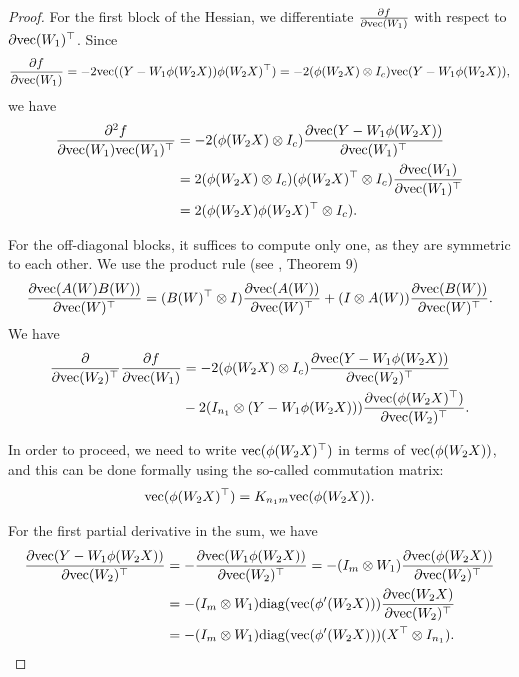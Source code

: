 \documentclass[a4paper,11pt]{article}
\newcommand{\1}{\mathbbm{1}}
\theoremstyle{plain}
\begin{document}
\begin{proof}
For the first block of the Hessian, we differentiate $\frac{\partial f}{\partial \textnormal{vec}(W_1)}$ with respect to $\partial \textnormal{vec}(W_1)^\top$. Since $$\frac{\partial f}{\partial \textnormal{vec}(W_1)} = -2 \textnormal{vec}((Y-W_1 \phi(W_2 X)) \phi(W_2 X)^\top) = -2 (\phi(W_2 X) \otimes I_c) \textnormal{vec}(Y-W_1 \phi(W_2 X)) , $$ we have
\begin{align*}
    \frac{\partial^2 f}{\partial \textnormal{vec}(W_1) \textnormal{vec}(W_1)^\top } &= -2 (\phi(W_2 X) \otimes I_c) \frac{\partial \textnormal{vec}(Y-W_1 \phi(W_2 X))}{\partial \textnormal{vec}(W_1)^\top} \\ & = 2(\phi(W_2 X) \otimes I_c)  (\phi(W_2 X)^\top \otimes I_c) \frac{\partial \textnormal{vec}(W_1)}{\partial \textnormal{vec}(W_1)^\top} \\ & = 2 (\phi(W_2 X) \phi(W_2 X)^\top \otimes I_c).
\end{align*}

For the off-diagonal blocks, it suffices to compute only one, as they are symmetric to each other. We use the product rule (see \cite{magnus1985matrix}, Theorem 9)
\begin{equation*}
    \frac{\partial \textnormal{vec}(A(W) B (W))}{\partial \textnormal{vec}(W)^\top} = (B(W)^\top \otimes I) \frac{\partial \textnormal{vec}(A(W))}{\partial \textnormal{vec}(W)^\top} + (I \otimes A(W)) \frac{\partial \textnormal{vec}(B(W))}{\partial \textnormal{vec}(W)^\top}.
\end{equation*}
We have
\begin{align*}
    \frac{\partial}{\partial \textnormal{vec}(W_2)^\top} \frac{\partial f}{\partial \textnormal{vec}(W_1)} 
& = -2 (\phi(W_2 X) \otimes I_c) \frac{\partial \textnormal{vec} (Y-W_1\phi(W_2 X)) }{\partial \textnormal{vec}(W_2)^\top} \\& - 2 (I_{n_1} \otimes (Y-W_1\phi(W_2 X)) ) \frac{\partial \textnormal{vec} (\phi(W_2 X)^\top) }{\partial \textnormal{vec}(W_2)^\top}. 
\end{align*}

In order to proceed, we need to write $\textnormal{vec}(\phi(W_2 X)^\top)$ in terms of $\textnormal{vec}(\phi(W_2 X))$, and this can be done formally using the so-called commutation matrix:
\begin{equation*}
   \textnormal{vec}(\phi(W_2 X)^\top) = K_{n_1 m}  \textnormal{vec}(\phi(W_2 X)).
\end{equation*}

For the first partial derivative in the sum, we have
\begin{align*}
  \frac{\partial \textnormal{vec} (Y-W_1\phi(W_2 X)) }{\partial \textnormal{vec}(W_2)^\top} & = -\frac{\partial \textnormal{vec} (W_1\phi(W_2 X)) }{\partial \textnormal{vec}(W_2)^\top}  = -(I_m \otimes W_1)\frac{\partial \textnormal{vec} (\phi(W_2 X)) }{\partial \textnormal{vec}(W_2)^\top} \\ & = -(I_m \otimes W_1) \textnormal{diag}(\textnormal{vec}(\phi'(W_2 X))) \frac{\partial \textnormal{vec}(W_2 X)}{\partial \textnormal{vec}(W_2)^\top} \\ & = -(I_m \otimes W_1) \textnormal{diag}(\textnormal{vec}(\phi'(W_2 X))) (X^\top \otimes I_{n_1}).
\end{align*}


\end{proof}
\end{document}
